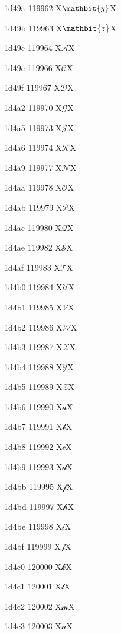\documentclass[11pt]{article}
\begin{document}
1d49a 119962 X{\ensuremath{\mathbit{y}}}X

1d49b 119963 X{\ensuremath{\mathbit{z}}}X

1d49c 119964 X{\ensuremath{\mathscr{A}}}X

1d49e 119966 X{\ensuremath{\mathscr{C}}}X

1d49f 119967 X{\ensuremath{\mathscr{D}}}X

1d4a2 119970 X{\ensuremath{\mathscr{G}}}X

1d4a5 119973 X{\ensuremath{\mathscr{J}}}X

1d4a6 119974 X{\ensuremath{\mathscr{K}}}X

1d4a9 119977 X{\ensuremath{\mathscr{N}}}X

1d4aa 119978 X{\ensuremath{\mathscr{O}}}X

1d4ab 119979 X{\ensuremath{\mathscr{P}}}X

1d4ac 119980 X{\ensuremath{\mathscr{Q}}}X

1d4ae 119982 X{\ensuremath{\mathscr{S}}}X

1d4af 119983 X{\ensuremath{\mathscr{T}}}X

1d4b0 119984 X{\ensuremath{\mathscr{U}}}X

1d4b1 119985 X{\ensuremath{\mathscr{V}}}X

1d4b2 119986 X{\ensuremath{\mathscr{W}}}X

1d4b3 119987 X{\ensuremath{\mathscr{X}}}X

1d4b4 119988 X{\ensuremath{\mathscr{Y}}}X

1d4b5 119989 X{\ensuremath{\mathscr{Z}}}X

1d4b6 119990 X{\ensuremath{\mathscr{a}}}X

1d4b7 119991 X{\ensuremath{\mathscr{b}}}X

1d4b8 119992 X{\ensuremath{\mathscr{c}}}X

1d4b9 119993 X{\ensuremath{\mathscr{d}}}X

1d4bb 119995 X{\ensuremath{\mathscr{f}}}X

1d4bd 119997 X{\ensuremath{\mathscr{h}}}X

1d4be 119998 X{\ensuremath{\mathscr{i}}}X

1d4bf 119999 X{\ensuremath{\mathscr{j}}}X

1d4c0 120000 X{\ensuremath{\mathscr{k}}}X

1d4c1 120001 X{\ensuremath{\mathscr{l}}}X

1d4c2 120002 X{\ensuremath{\mathscr{m}}}X

1d4c3 120003 X{\ensuremath{\mathscr{n}}}X
\end{document}
